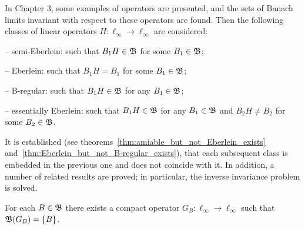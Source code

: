 In Chapter 3, some examples of operators are presented, and the sets of Banach limits
invariant with respect to these operators are found.
Then the following classes of linear operators $H:\ell_\infty \to \ell_\infty$ are considered:

-- semi-Eberlein: such that $B_1 H \in\mathfrak{B}$ for some $B_1\in \mathfrak{B}$;

-- Eberlein: such that $B_1 H = B_1$ for some $B_1\in \mathfrak{B}$;

-- B-regular: such that $B_1 H \in \mathfrak{B}$ for any $B_1\in \mathfrak{B}$;

-- essentially Eberlein: such that $B_1 H \in \mathfrak{B}$ for any $B_1\in \mathfrak{B}$ and $B_2 H \ne B_2$ for some $B_2\in \mathfrak{B}$.

It is established (see theorems~\ref{thm:amiable_but_not_Eberlein_exists} and~\ref{thm:Eberlein_but_not_B-regular_exists}),
that each subsequent class is embedded in the previous one and does not coincide with it.
In addition, a number of related results are proved; in particular, the inverse invariance problem is solved.

	For each $B\in \mathfrak{B}$ there exists a compact operator $G_B:\ell_\infty \to \ell_\infty$
	such that $\mathfrak{B}(G_B) = \{B\}$.
